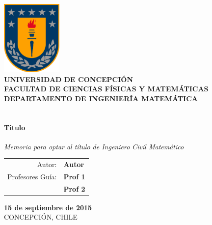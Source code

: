 
\begin{titlepage}
\  \\ \vspace{0.5cm} 
\begin{center}
  {\includegraphics[width=3cm]{./img/escudo.pdf}
  \\ \vspace{0.4cm} 
  {\small\bf  UNIVERSIDAD DE CONCEPCI\'ON}\\ \vspace{0.4cm}
  {\small\bf    FACULTAD DE CIENCIAS F\'ISICAS Y MATEM\'ATICAS}\\ \vspace{0.4cm}
  {\small\bf    DEPARTAMENTO DE INGENIER\'IA MATEM\'ATICA}\\ \vspace{0.4cm}
      \hskip 1pt \\ \vspace{0.4cm} 
      \hskip 1pt \\ \vspace{0.4cm}
	  {\bf\huge Titulo}
  \hskip 1pt \\ \vspace{0.8cm}
      \hskip 1pt \\ %
      {\it\LARGE Memoria para optar al t\'itulo de Ingeniero Civil Matem\'atico}\\ \vspace{0.5cm}}
  {
  \large
  \begin{center}
  \begin{tabular}{rl}
  \vspace{0.5cm} 
  Autor:			& {\bf Autor}\\
  Profesores Guía:	& {\bf Prof 1} \\ 			
					& {\bf Prof 2}
  \end{tabular}
  \end{center}
  
  \vfill
  {{\bf 15 de septiembre de 2015}\\ 
  CONCEPCI\'ON, CHILE}
  }
\end{center}
\end{titlepage} 

   \renewcommand{\baselinestretch}{1}    %